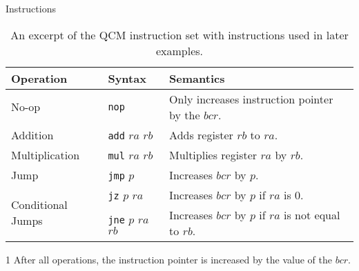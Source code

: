 \begin{frame}{Instructions}
    \begin{table}[htp]
        \centering
        \begin{threeparttable}[b]
            \begin{tabular}{llp{}}
                \multicolumn{1}{l|}{Operation}                          & \multicolumn{1}{l|}{Syntax}                                      & Semantics\tnote{1}                                                              \\ \hline
                
                \multicolumn{1}{l|}{No-op}                              & \multicolumn{1}{l|}{\texttt{nop}}               & Only increases instruction pointer by the $bcr$.     \\ \hline
                
                \multicolumn{1}{l|}{Addition}                           & \multicolumn{1}{l|}{\texttt{add} $ra$ $rb$}     & Adds register $rb$ to $ra$.                                            \\
                \multicolumn{1}{l|}{Multiplication}                     & \multicolumn{1}{l|}{\texttt{mul} $ra$ $rb$}     & Multiplies register $ra$ by $rb$.                                      \\ \hline
                
                \multicolumn{1}{l|}{Jump}                               & \multicolumn{1}{l|}{\texttt{jmp} $p$}           & Increases $bcr$ by $p$.                              \\
                \multicolumn{1}{l|}{\multirow{2}{*}{Conditional Jumps}} & \multicolumn{1}{l|}{\texttt{jz} $p$ $ra$}       & Increases $bcr$ by $p$ if $ra$ is $0$.               \\
                \multicolumn{1}{l|}{}                                   & \multicolumn{1}{l|}{\texttt{jne} $p$ $ra$ $rb$} & Increases $bcr$ by $p$ if $ra$ is not equal to $rb$. 
            \end{tabular}
            \begin{tablenotes}
                \item [1] After all operations, the instruction pointer is increased by the value of the $bcr$.
            \end{tablenotes}
        \end{threeparttable}
        \caption{An excerpt of the QCM instruction set with instructions used in later examples.}
        \label{tab:qcm_instructionset}
    \end{table}
\end{frame}

